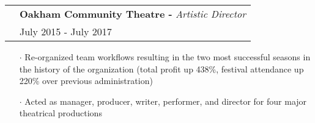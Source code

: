 \documentclass[a4paper, oneside, final]{scrartcl} %
\newcommand{\gray}{\rowcolor[gray]{.90}} %
\begin{document}
\begin{center}
  \vspace{-0.05 cm}

  \renewcommand{\arraystretch}{1.3}
  \vspace{-0.05cm}

  \begin{tabularx}{1.00\linewidth}{>{\raggedleft\scshape}p{0cm}X}
    \gray& \textbf{Oakham Community Theatre -} \textit{Artistic Director}\\
    \gray& {July 2015 - July 2017}\\
  \end{tabularx}
  \vspace{-0.2cm}
  \begin{itemize} \itemsep-0.2cm
      \vspace{-0.1cm}

    \item[$\cdot$] Re-organized team workflows resulting in the two most successful seasons in the history of the organization (total profit up 438\%, festival attendance up 220\% over previous administration)\\
    \item[$\cdot$] Acted as manager, producer, writer, performer, and director for four major theatrical productions
  \end{itemize}

  \vspace{-0.05 cm}



\end{center}
\end{document}
